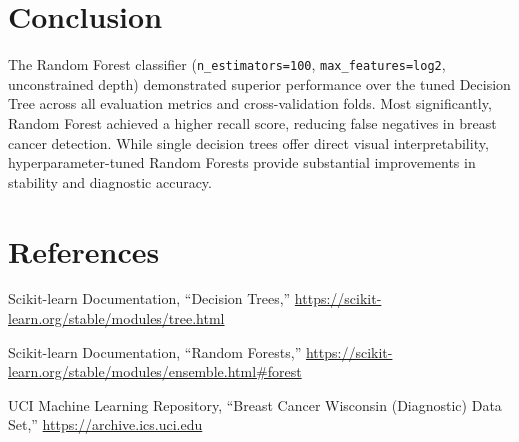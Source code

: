 \documentclass[12pt,a4paper]{article}
\begin{document}
\section{Conclusion}
The Random Forest classifier (\texttt{n\_estimators=100}, \texttt{max\_features=log2}, unconstrained depth) demonstrated superior performance over the tuned Decision Tree across all evaluation metrics and cross-validation folds. Most significantly, Random Forest achieved a higher recall score, reducing false negatives in breast cancer detection. While single decision trees offer direct visual interpretability, hyperparameter-tuned Random Forests provide substantial improvements in stability and diagnostic accuracy.

\section{References}
\begin{enumerate}[label={[\arabic*]}]
\item Scikit-learn Documentation, ``Decision Trees,'' \url{https://scikit-learn.org/stable/modules/tree.html}
\item Scikit-learn Documentation, ``Random Forests,'' \url{https://scikit-learn.org/stable/modules/ensemble.html#forest}
\item UCI Machine Learning Repository, ``Breast Cancer Wisconsin (Diagnostic) Data Set,'' \url{https://archive.ics.uci.edu}
\end{enumerate}
\end{document}
